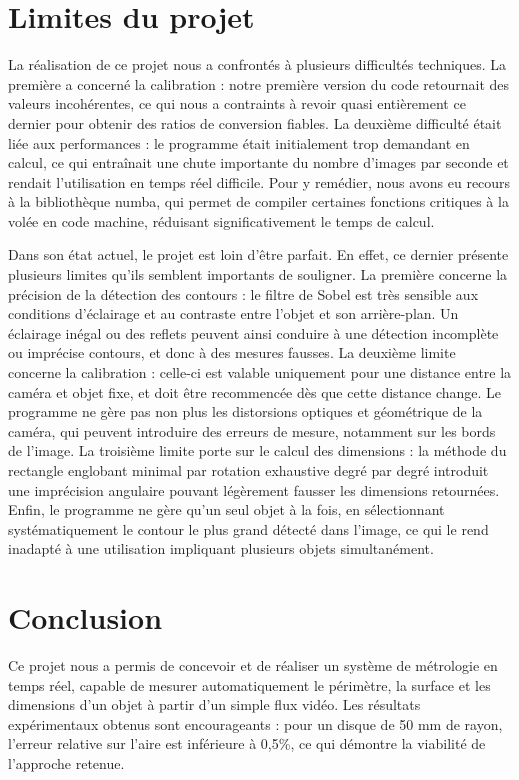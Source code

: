\documentclass[titlepage]{article}
\begin{document}
	\section{Limites du projet}
	La réalisation de ce projet nous a confrontés à plusieurs difficultés techniques. La première a concerné la calibration : notre première version du code retournait des valeurs incohérentes, ce qui nous a contraints à revoir quasi entièrement ce dernier pour obtenir des ratios de conversion fiables. La deuxième difficulté était liée aux performances : le programme était initialement trop demandant en calcul, ce qui entraînait une chute importante du nombre d'images par seconde et rendait l'utilisation en temps réel difficile. Pour y remédier, nous avons eu recours à la bibliothèque numba, qui permet de compiler certaines fonctions critiques à la volée en code machine, réduisant significativement le temps de calcul.
	
	Dans son état actuel, le projet est loin d’être parfait. En effet, ce dernier présente plusieurs limites qu’ils semblent importants de souligner. La première concerne la précision de la détection des contours : le filtre de Sobel est très sensible aux conditions d'éclairage et au contraste entre l'objet et son arrière-plan. Un éclairage inégal ou des reflets peuvent ainsi conduire à une détection incomplète ou imprécise contours, et donc à des mesures fausses. La deuxième limite concerne la calibration : celle-ci est valable uniquement pour une distance entre la caméra et objet fixe, et doit être recommencée dès que cette distance change. Le programme ne gère pas non plus les distorsions optiques et géométrique de la caméra, qui peuvent introduire des erreurs de mesure, notamment sur les bords de l'image. La troisième limite porte sur le calcul des dimensions : la méthode du rectangle englobant minimal par rotation exhaustive degré par degré introduit une imprécision angulaire pouvant légèrement fausser les dimensions retournées. Enfin, le programme ne gère qu'un seul objet à la fois, en sélectionnant systématiquement le contour le plus grand détecté dans l'image, ce qui le rend inadapté à une utilisation impliquant plusieurs objets simultanément.
	
	\section{Conclusion}
	Ce projet nous a permis de concevoir et de réaliser un système de métrologie en temps réel, capable de mesurer automatiquement le périmètre, la surface et les dimensions d'un objet à partir d'un simple flux vidéo. Les résultats expérimentaux obtenus sont encourageants : pour un disque de 50 mm de rayon, l'erreur relative sur l'aire est inférieure à 0,5\%, ce qui démontre la viabilité de l'approche retenue.
	
\end{document}
